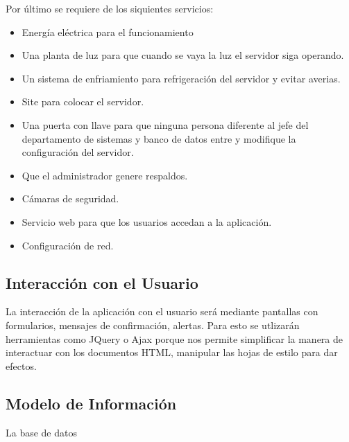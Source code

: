 Por último se requiere de los siquientes servicios: 
\begin{itemize}
	\item Energía eléctrica para el funcionamiento
	\item Una planta de luz para que cuando se vaya la luz el servidor siga operando.
	\item Un sistema de enfriamiento para refrigeración del servidor y evitar averias.
	\item Site para colocar el servidor.
	\item Una puerta con llave para que ninguna persona diferente al jefe del departamento de sistemas y banco de datos entre y modifique la configuración del servidor.
	\item Que el administrador genere respaldos.
	\item Cámaras de seguridad. 
	\item Servicio web para que los usuarios accedan a la aplicación. 
	\item Configuración de red.
\end{itemize} 

\subsection{Interacción con el Usuario}
La interacción de la aplicación con el usuario será mediante pantallas con formularios, mensajes de confirmación, alertas. Para esto se utlizarán herramientas como JQuery o Ajax porque nos permite simplificar la manera de interactuar con los documentos HTML, manipular las hojas de estilo para dar efectos.

\subsection{Modelo de Información}

La base de datos 